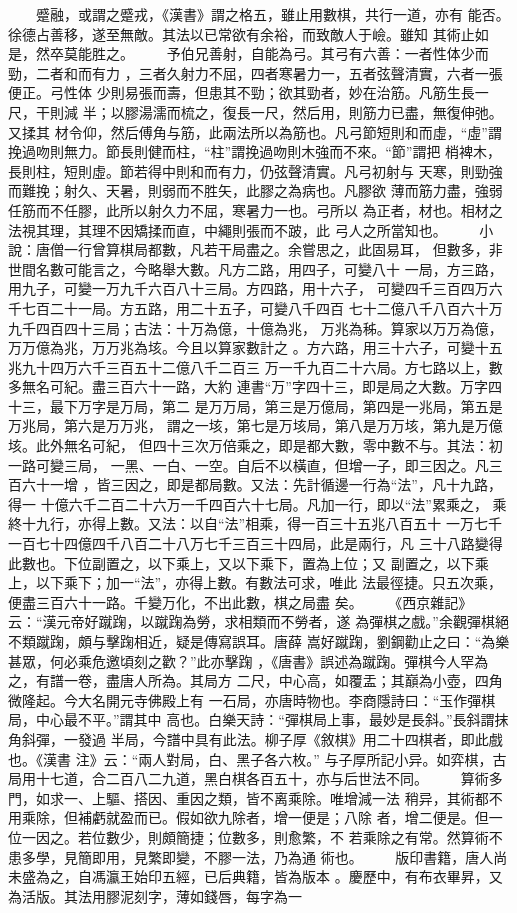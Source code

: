 \documentclass{ctexart}
\begin{document}
　　蹙融，或謂之蹙戎，《漢書》謂之格五，雖止用數棋，共行一道，亦有 能否。徐德占善移，遂至無敵。其法以已常欲有余裕，而致敵人于嶮。雖知 其術止如是，然卒莫能胜之。 　　予伯兄善射，自能為弓。其弓有六善：一者性体少而勁，二者和而有力 ，三者久射力不屈，四者寒暑力一，五者弦聲清實，六者一張便正。弓性体 少則易張而壽，但患其不勁；欲其勁者，妙在治筋。凡筋生長一尺，干則減 半；以膠湯濡而梳之，復長一尺，然后用，則筋力已盡，無復伸弛。又揉其 材令仰，然后傅角与筋，此兩法所以為筋也。凡弓節短則和而虛，``虛''謂 挽過吻則無力。節長則健而柱，``柱''謂挽過吻則木強而不來。``節''謂把 梢裨木，長則柱，短則虛。節若得中則和而有力，仍弦聲清實。凡弓初射与 天寒，則勁強而難挽；射久、天暑，則弱而不胜矢，此膠之為病也。凡膠欲 薄而筋力盡，強弱任筋而不任膠，此所以射久力不屈，寒暑力一也。弓所以 為正者，材也。相材之法視其理，其理不因矯揉而直，中繩則張而不跛，此 弓人之所當知也。 　　小說：唐僧一行曾算棋局都數，凡若干局盡之。余嘗思之，此固易耳， 但數多，非世間名數可能言之，今略舉大數。凡方二路，用四子，可變八十 一局，方三路，用九子，可變一万九千六百八十三局。方四路，用十六子， 可變四千三百四万六千七百二十一局。方五路，用二十五子，可變八千四百 七十二億八千八百六十万九千四百四十三局；古法：十万為億，十億為兆， 万兆為秭。算家以万万為億，万万億為兆，万万兆為垓。今且以算家數計之 。方六路，用三十六子，可變十五兆九十四万六千三百五十二億八千二百三 万一千九百二十六局。方七路以上，數多無名可紀。盡三百六十一路，大約 連書``万''字四十三，即是局之大數。万字四十三，最下万字是万局，第二 是万万局，第三是万億局，第四是一兆局，第五是万兆局，第六是万万兆， 謂之一垓，第七是万垓局，第八是万万垓，第九是万億垓。此外無名可紀， 但四十三次万倍乘之，即是都大數，零中數不与。其法：初一路可變三局， 一黑、一白、一空。自后不以橫直，但增一子，即三因之。凡三百六十一增 ，皆三因之，即是都局數。又法：先計循邊一行為``法''，凡十九路，得一 十億六千二百二十六万一千四百六十七局。凡加一行，即以``法''累乘之， 乘終十九行，亦得上數。又法：以自``法''相乘，得一百三十五兆八百五十 一万七千一百七十四億四千八百二十八万七千三百三十四局，此是兩行，凡 三十八路變得此數也。下位副置之，以下乘上，又以下乘下，置為上位；又 副置之，以下乘上，以下乘下；加一``法''，亦得上數。有數法可求，唯此 法最徑捷。只五次乘，便盡三百六十一路。千變万化，不出此數，棋之局盡 矣。 　　《西京雜記》云：``漢元帝好蹴踘，以蹴踘為勞，求相類而不勞者，遂 為彈棋之戲。''余觀彈棋絕不類蹴踘，頗与擊踘相近，疑是傳寫誤耳。唐薛 嵩好蹴踘，劉鋼勸止之曰：``為樂甚眾，何必乘危邀頃刻之歡？''此亦擊踘 ，《唐書》誤述為蹴踘。彈棋今人罕為之，有譜一卷，盡唐人所為。其局方 二尺，中心高，如覆盂；其巔為小壺，四角微隆起。今大名開元寺佛殿上有 一石局，亦唐時物也。李商隱詩曰：``玉作彈棋局，中心最不平。''謂其中 高也。白樂天詩：``彈棋局上事，最妙是長斜。''長斜謂抹角斜彈，一發過 半局，今譜中具有此法。柳子厚《敘棋》用二十四棋者，即此戲也。《漢書 注》云：``兩人對局，白、黑子各六枚。'' 与子厚所記小异。如弈棋，古 局用十七道，合二百八二九道，黑白棋各百五十，亦与后世法不同。 　　算術多門，如求一、上驅、搭因、重因之類，皆不离乘除。唯增減一法 稍异，其術都不用乘除，但補虧就盈而已。假如欲九除者，增一便是；八除 者，增二便是。但一位一因之。若位數少，則頗簡捷；位數多，則愈繁，不 若乘除之有常。然算術不患多學，見簡即用，見繁即變，不膠一法，乃為通 術也。 　　版印書籍，唐人尚未盛為之，自馮瀛王始印五經，已后典籍，皆為版本 。慶歷中，有布衣畢昇，又為活版。其法用膠泥刻字，薄如錢唇，每字為一 
\end{document}
